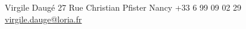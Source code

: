 \documentclass[pastel]{simplehipstercv}
\newlength{\rightcolwidth}
\begin{document}
\begin{paracol}{2}
\vfill{} %

\setlength{\parindent}{0pt}
\begin{minipage}[t]{\rightcolwidth}
\begin{center}\fontfamily{\sfdefault}\selectfont \color{black!70}
{\small Virgile Daugé  27 Rue Christian Pfister  Nancy  +33 6 99 09 02 29 \newline{} \href{mailto:virgile.dauge@loria.fr}{virgile.dauge@loria.fr}
}
\end{center}
\end{minipage}

\end{paracol}
\end{document}
